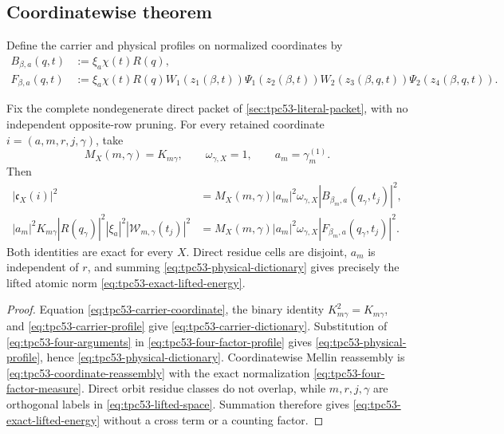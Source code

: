 \subsection{Coordinatewise theorem}

Define the carrier and physical profiles on normalized coordinates by
\begin{align}
 B_{\beta,a}(q,t)
 &:=\xi_a\chi(t)R(q),
 \label{eq:tpc53-carrier-profile}\\
 F_{\beta,a}(q,t)
 &:=\xi_a\chi(t)R(q)
  W_1(z_1(\beta,t))\Psi_1(z_2(\beta,t))
  W_2(z_3(\beta,q,t))\Psi_2(z_4(\beta,q,t)).
 \label{eq:tpc53-physical-profile}
\end{align}

\begin{theorem}
\label{thm:tpc53-exact-dictionary}
Fix the complete nondegenerate direct packet of
\cref{sec:tpc53-literal-packet}, with no independent opposite-row
pruning.  For every retained coordinate \(i=(a,m,r,j,\gamma)\), take
\begin{equation}
 M_X(m,\gamma)=K_{m\gamma},\qquad
 \omega_{\gamma,X}=1,\qquad a_m=\gamma_m^{(1)}.
 \label{eq:tpc53-dictionary-base-data}
\end{equation}
Then
\begin{align}
 |\mathfrak c_X(i)|^2
 &=M_X(m,\gamma)|a_m|^2\omega_{\gamma,X}
   |B_{\beta_m,a}(q_\gamma,t_j)|^2,
 \label{eq:tpc53-carrier-dictionary}\\
 |a_m|^2K_{m\gamma}|R(q_\gamma)|^2|\xi_a|^2
 |\mathcal W_{m,\gamma}(t_j)|^2
 &=M_X(m,\gamma)|a_m|^2\omega_{\gamma,X}
   |F_{\beta_m,a}(q_\gamma,t_j)|^2.
 \label{eq:tpc53-physical-dictionary}
\end{align}
Both identities are exact for every \(X\).  Direct residue cells are
disjoint, \(a_m\) is independent of \(r\), and summing
\eqref{eq:tpc53-physical-dictionary} gives precisely the lifted atomic
norm \eqref{eq:tpc53-exact-lifted-energy}.
\end{theorem}

\begin{proof}
Equation \eqref{eq:tpc53-carrier-coordinate}, the binary identity
\(K_{m\gamma}^2=K_{m\gamma}\), and
\eqref{eq:tpc53-carrier-profile} give
\eqref{eq:tpc53-carrier-dictionary}.  Substitution of
\eqref{eq:tpc53-four-arguments} in
\eqref{eq:tpc53-four-factor-profile} gives
\eqref{eq:tpc53-physical-profile}, hence
\eqref{eq:tpc53-physical-dictionary}.  Coordinatewise Mellin
reassembly is \eqref{eq:tpc53-coordinate-reassembly} with the exact
normalization \eqref{eq:tpc53-four-factor-measure}.  Direct orbit
residue classes do not overlap, while \(m,r,j,\gamma\) are orthogonal
labels in \eqref{eq:tpc53-lifted-space}.  Summation therefore gives
\eqref{eq:tpc53-exact-lifted-energy} without a cross term or a counting
factor.
\end{proof}

